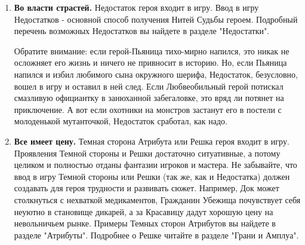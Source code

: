 \begin{enumerate}
    \item \textbf{Во власти страстей.}
    \newline Недостаток героя входит в игру. Ввод в игру Недостатков - основной способ получения Нитей Судьбы героем. Подробный перечень возможных Недостатков вы найдете в разделе "Недостатки". 
    \begin{tcolorbox}
        Обратите внимание: если герой-Пьяница тихо-мирно напился, это никак не осложняет его жизнь и ничего не привносит в историю. Но, если Пьяница напился и избил любимого сына окружного шерифа, Недостаток, безусловно, вошел в игру и оставил в ней след. Если Любвеобильный герой потискал смазливую официантку в занюханной забегаловке, это вряд ли потянет на приключение. А вот если охотники на монстров застанут его в постели с молоденькой мутанточкой, Недостаток сработал, как надо.
    \end{tcolorbox}

    \item \textbf{Все имеет цену.}
    \newline Темная сторона Атрибута или Решка героя входит в игру. Проявления Темной стороны и Решки достаточно ситуативные, а потому целиком и полностью отданы фантазии игроков и мастера. Не забывайте, что ввод в игру Темной стороны или Решки (так же, как и Недостатка) должен создавать для героя трудности и развивать сюжет. Например, Док может столкнуться с нехваткой медикаментов, Гражданин Убежища почувствует себя неуютно в становище дикарей, а за Красавицу дадут хорошую цену на невольничьем рынке.
    \newline Примеры Темных сторон Атрибутов вы найдете в разделе "Атрибуты". Подробнее о Решке читайте в разделе "Грани и Амплуа". 


\end{enumerate}
